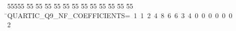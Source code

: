 %
%
\begin{tabbing}
55555 \= 55 \= 55 \= 55 \= 55 \= 55 \= 55 \= 55 \= 55 \= 55 \= 55 \= 55 \= 55 \= \>QUARTIC\_Q9\_NF\_COEFFICIENTS=\ 1\ 1\ 2\ 4\ 8\ 6\ 6\ 3\ 4\ 0\ 0\ 0\ 0\ 0\ 0\ \\[0pt]
2\>\end{tabbing}

